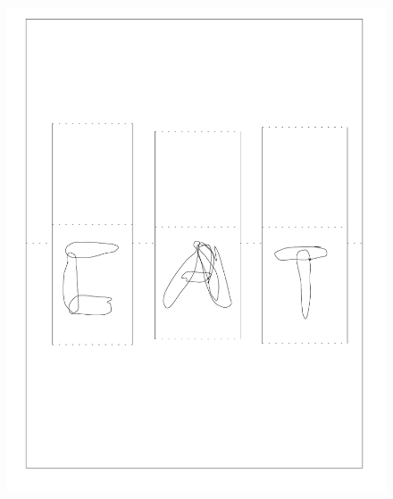 \begin{figure}[htbp]
\centering
\includegraphics{figures/91_Appendix_DAX_Creations/cat_name.png}
\caption{}
\end{figure}

